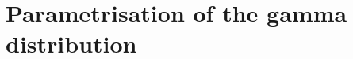 \documentclass[preprint,authoryear,12pt]{elsarticle}
\begin{document}

\section{Parametrisation of the gamma distribution}







\end{document}
